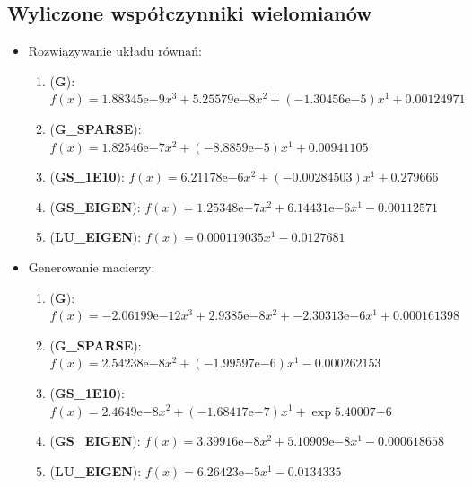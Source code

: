 \documentclass[10pt]{article}
\newcommand{\expnumber}[2]{{#1}\mathrm{e}{#2}}
\begin{document}
\subsection{Wyliczone współczynniki wielomianów}
\begin{itemize}
	\item Rozwiązywanie układu równań:
	\begin{enumerate}
		\item (\textbf{G}): $f(x) = \expnumber{1.88345}{-9} x^3 + \expnumber{5.25579}{-8} x^2 + (\expnumber{-1.30456}{-5}) x^1 + 0.00124971$
		\item (\textbf{G\_SPARSE}): $f(x) = \expnumber{1.82546}{-7} x^2 + (\expnumber{-8.8859}{-5}) x^1 + 0.00941105$
		\item (\textbf{GS\_1E10}): $f(x) = \expnumber{6.21178}{-6} x^2 + (-0.00284503) x^1 + 0.279666$
		\item (\textbf{GS\_EIGEN}): $f(x) = \expnumber{1.25348}{-7} x^2 + \expnumber{6.14431}{-6} x^1 - 0.00112571$
		\item (\textbf{LU\_EIGEN}): $f(x) = 0.000119035 x^1 - 0.0127681$
	\end{enumerate}
	\item Generowanie macierzy:
	\begin{enumerate}
		\item (\textbf{G}): $f(x) = \expnumber{-2.06199}{-12} x^3 + \expnumber{2.9385}{-8} x^2 + \expnumber{-2.30313}{-6} x^1 + 0.000161398$
		\item (\textbf{G\_SPARSE}): $f(x) = \expnumber{2.54238}{-8} x^2 + (\expnumber{-1.99597}{-6}) x^1 - 0.000262153$
		\item (\textbf{GS\_1E10}): $f(x) = \expnumber{2.4649}{-8} x^2 + (\expnumber{-1.68417}{-7}) x^1 + \exp{5.40007}{-6}$
		\item (\textbf{GS\_EIGEN}): $f(x) = \expnumber{3.39916}{-8} x^2 + \expnumber{5.10909}{-8} x^1 - 0.000618658$
		\item (\textbf{LU\_EIGEN}): $f(x) = \expnumber{6.26423}{-5} x^1 - 0.0134335$
	\end{enumerate}
\end{itemize}
\end{document}
